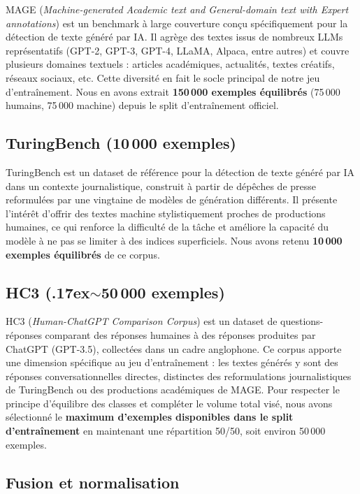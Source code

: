 ﻿\documentclass[12pt, a4paper]{report}
\begin{document}
MAGE (\textit{Machine-generated Academic text and General-domain text with
Expert annotations}) est un benchmark à large couverture conçu spécifiquement
pour la détection de texte généré par IA. Il agrège des textes issus de nombreux
LLMs représentatifs (GPT-2, GPT-3, GPT-4, LLaMA, Alpaca, entre autres) et couvre
plusieurs domaines textuels : articles académiques, actualités, textes créatifs,
réseaux sociaux, etc. Cette diversité en fait le socle principal de notre jeu
d'entraînement. Nous en avons extrait \textbf{150\,000 exemples équilibrés}
(75\,000 humains, 75\,000 machine) depuis le split d'entraînement officiel.

\subsection{TuringBench (10\,000 exemples)}

TuringBench est un dataset de référence pour la détection de texte généré par IA
dans un contexte journalistique, construit à partir de dépêches de presse
reformulées par une vingtaine de modèles de génération différents. Il présente
l'intérêt d'offrir des textes machine stylistiquement proches de productions
humaines, ce qui renforce la difficulté de la tâche et améliore la capacité du
modèle à ne pas se limiter à des indices superficiels. Nous avons retenu
\textbf{10\,000 exemples équilibrés} de ce corpus.

\subsection{HC3 ({\raise.17ex\hbox{$\scriptstyle\sim$}}50\,000 exemples)}

HC3 (\textit{Human-ChatGPT Comparison Corpus}) est un dataset de questions-réponses
comparant des réponses humaines à des réponses produites par ChatGPT (GPT-3.5),
collectées dans un cadre anglophone. Ce corpus apporte une dimension spécifique
au jeu d'entraînement : les textes générés y sont des réponses conversationnelles
directes, distinctes des reformulations journalistiques de TuringBench ou des
productions académiques de MAGE. Pour respecter le principe d'équilibre des
classes et compléter le volume total visé, nous avons sélectionné le
\textbf{maximum d'exemples disponibles dans le split d'entraînement} en maintenant
une répartition 50/50, soit environ 50\,000 exemples.

\subsection{Fusion et normalisation}
\end{document}
